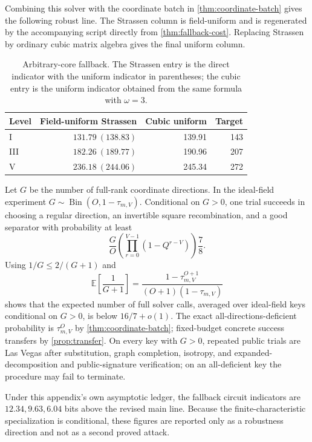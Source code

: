 \documentclass[10pt,a4paper]{article}
\begin{document}
Combining this solver with the coordinate batch in \cref{thm:coordinate-batch} gives the following robust line.  The Strassen column is field-uniform and is regenerated by the accompanying script directly from \cref{thm:fallback-cost}.  Replacing Strassen by ordinary cubic matrix algebra gives the final uniform column.

\begin{table}[H]
\centering
\small
\setlength{\tabcolsep}{4pt}
\caption{Arbitrary-core fallback.  The Strassen entry is the direct indicator with the uniform indicator in parentheses; the cubic entry is the uniform indicator obtained from the same formula with $\omega=3$.}
\label{tab:fallback-costs}
\begin{tabular}{@{}lrrr@{}}
\toprule
Level & Field-uniform Strassen & Cubic uniform & Target\\
\midrule
I   & $131.79\ (138.83)$ & 139.91 & 143\\
III & $182.26\ (189.77)$ & 190.96 & 207\\
V   & $236.18\ (244.06)$ & 245.34 & 272\\
\bottomrule
\end{tabular}
\end{table}

Let $G$ be the number of full-rank coordinate directions.  In the ideal-field experiment $G\sim\operatorname{Bin}(O,1-\tau_{m,V})$.  Conditional on $G>0$, one trial succeeds in choosing a regular direction, an invertible square recombination, and a good separator with probability at least
\[
\frac{G}{O}
\left(\prod_{r=0}^{V-1}(1-Q^{r-V})\right)\frac78.
\]
Using $1/G\le2/(G+1)$ and
\[
\mathbb E\!\left[\frac1{G+1}\right]
=\frac{1-\tau_{m,V}^{O+1}}{(O+1)(1-\tau_{m,V})}
\]
shows that the expected number of full solver calls, averaged over ideal-field keys conditional on $G>0$, is below $16/7+o(1)$.  The exact all-directions-deficient probability is $\tau_{m,V}^O$ by \cref{thm:coordinate-batch}; fixed-budget concrete success transfers by \cref{prop:transfer}.  On every key with $G>0$, repeated public trials are Las Vegas after substitution, graph completion, isotropy, and expanded-decomposition and public-signature verification; on an all-deficient key the procedure may fail to terminate.

Under this appendix's own asymptotic ledger, the fallback circuit indicators are $12.34,9.63,6.04$ bits above the revised main line.  Because the finite-characteristic specialization is conditional, these figures are reported only as a robustness direction and not as a second proved attack.
\end{document}
